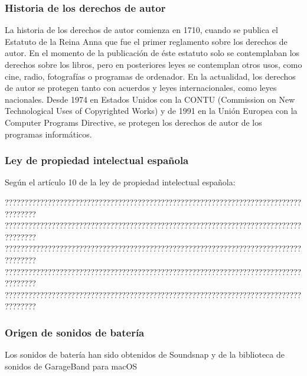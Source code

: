 \documentclass{article}
\begin{document}
\subsubsection{Historia de los derechos de autor}
La historia de los derechos de autor comienza en 1710, cuando se publica el Estatuto de la Reina
Anna\cite{estatuto_anna} que fue el primer reglamento sobre los derechos de autor. En el momento de la publicación
de éste estatuto solo se contemplaban los derechos sobre los libros, pero en posteriores leyes se contemplan otros
usos, como cine, radio, fotografías o programas de ordenador.\newline
En la actualidad, los derechos de autor se protegen tanto con acuerdos y leyes internacionales, como leyes
nacionales.\newline
Desde 1974 en Estados Unidos con la CONTU\cite{contu} (Commission on New Technological Uses of Copyrighted Works) y
de 1991 en la Unión Europea con la Computer Programs Directive\cite{com_pro_dir}, se protegen los derechos de autor
de los programas informáticos.

\subsubsection{Ley de propiedad intelectual española}
Según el artículo 10 de la ley de propiedad intelectual española:\cite{prop_intelectual}

????????????????????????????????????????????????????????????????????????????????????
????????????????????????????????????????????????????????????????????????????????????
????????????????????????????????????????????????????????????????????????????????????
????????????????????????????????????????????????????????????????????????????????????
????????????????????????????????????????????????????????????????????????????????????

\subsubsection{Origen de sonidos de batería}
Los sonidos de batería han sido obtenidos de Soundsnap\cite{soundsnap} y de la biblioteca de sonidos de GarageBand
para macOS\cite{garageband}
\end{document}

